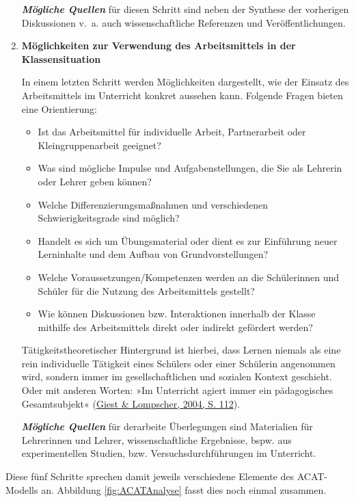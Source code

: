 \documentclass[
]{scrbook}
\providecommand{\tightlist}{%
  \setlength{\itemsep}{0pt}\setlength{\parskip}{0pt}}
\theoremstyle{definition}
\theoremstyle{definition}
\theoremstyle{definition}
\theoremstyle{definition}
\theoremstyle{remark}
\begin{document}
\begin{enumerate}
  \textbf{\emph{Mögliche Quellen}} für diesen Schritt sind neben der Synthese der vorherigen Diskussionen v.~a. auch wissenschaftliche Referenzen und Veröffentlichungen.
\item
  \textbf{Möglichkeiten zur Verwendung des Arbeitsmittels in der Klassensituation }

  In einem letzten Schritt werden Möglichkeiten dargestellt, wie der Einsatz des Arbeitsmittels im Unterricht konkret aussehen kann. Folgende Fragen bieten eine Orientierung:

  \begin{itemize}
  \tightlist
  \item
    Ist das Arbeitsmittel für individuelle Arbeit, Partnerarbeit oder Kleingruppenarbeit geeignet?
  \item
    Was sind mögliche Impulse und Aufgabenstellungen, die Sie als Lehrerin oder Lehrer geben können?
  \item
    Welche Differenzierungsmaßnahmen und verschiedenen Schwierigkeitsgrade sind möglich?
  \item
    Handelt es sich um Übungsmaterial oder dient es zur Einführung neuer Lerninhalte und dem Aufbau von Grundvorstellungen?
  \item
    Welche Voraussetzungen/Kompetenzen werden an die Schülerinnen und Schüler für die Nutzung des Arbeitsmittels gestellt?
  \item
    Wie können Diskussionen bzw. Interaktionen innerhalb der Klasse mithilfe des Arbeitsmittels direkt oder indirekt gefördert werden?
  \end{itemize}

  Tätigkeitstheoretischer Hintergrund ist hierbei, dass Lernen niemals als eine rein individuelle Tätigkeit eines Schülers oder einer Schülerin angenommen wird, sondern immer im gesellschaftlichen und sozialen Kontext geschieht. Oder mit anderen Worten: »Im Unterricht agiert immer ein pädagogisches Gesamtsubjekt« (\protect\hyperlink{ref-Giest2004a}{Giest \& Lompscher, 2004, S. 112}).

  \textbf{\emph{Mögliche Quellen}} für derarbeite Überlegungen sind Materialien für Lehrerinnen und Lehrer, wissenschaftliche Ergebnisse, bspw. aus experimentellen Studien, bzw. Versuchsdurchführungen im Unterricht.
\end{enumerate}

Diese fünf Schritte sprechen damit jeweils verschiedene Elemente des ACAT-Modells an. Abbildung \ref{fig:ACATAnalyse} fasst dies noch einmal zusammen.
\end{document}
